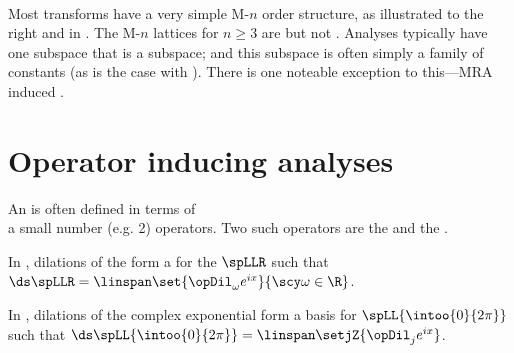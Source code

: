 \mbox{}\\
\begin{minipage}{\tw-65mm}%
  Most transforms have a very simple M-$n$ order structure,
  as illustrated to the right and in .
  The M-$n$ lattices for $n\ge3$ are  but not .
  Analyses typically have one subspace that is a  subspace;
  and this subspace is often simply a family of constants
  (as is the case with ).
  There is one noteable exception to this---MRA induced .
\end{minipage}\hfill%

\section{Operator inducing analyses}
\hfill
\begin{minipage}{\tw-120mm}
  An  is often defined in terms of \\a small number (e.g. 2) operators.
  Two such operators are the  and the .
\end{minipage}
\hfill{}

\begin{example}
In ,  {dilations}  of the 
form a   for the  $\spLLR$ 
such that
\quad$\ds\spLLR=\linspan\set{\opDil_\omega e^{ix}}{\scy\omega\in\R}$.
\end{example}

\begin{example}
In ,  dilations of the complex exponential 
form a  basis for $\spLL{\intoo{0}{2\pi}}$ such that
\quad$\ds\spLL{\intoo{0}{2\pi}}=\linspan\setjZ{\opDil_j e^{ix}}$.
\end{example}


